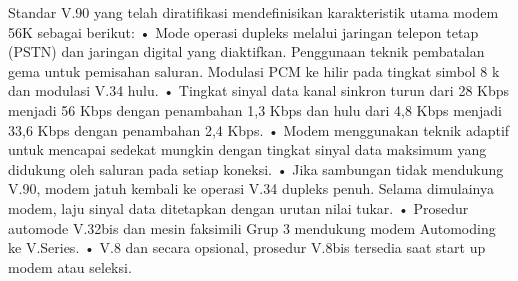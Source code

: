 \cite{gao1998introduction} Standar V.90 yang telah diratifikasi mendefinisikan karakteristik utama modem 56K sebagai berikut: • Mode operasi dupleks melalui jaringan telepon tetap (PSTN) dan jaringan digital yang diaktifkan. Penggunaan teknik pembatalan gema untuk pemisahan saluran. Modulasi PCM ke hilir pada tingkat simbol 8 k dan modulasi V.34 hulu. • Tingkat sinyal data kanal sinkron turun dari 28 Kbps menjadi 56 Kbps dengan penambahan 1,3 Kbps dan hulu dari 4,8 Kbps menjadi 33,6 Kbps dengan penambahan 2,4 Kbps. • Modem menggunakan teknik adaptif untuk mencapai sedekat mungkin dengan tingkat sinyal data maksimum yang didukung oleh saluran pada setiap koneksi. • Jika sambungan tidak mendukung V.90, modem jatuh kembali ke operasi V.34 dupleks penuh. Selama dimulainya modem, laju sinyal data ditetapkan dengan urutan nilai tukar. • Prosedur automode V.32bis dan mesin faksimili Grup 3 mendukung modem Automoding ke V.Series. • V.8 dan secara opsional, prosedur V.8bis tersedia saat start up modem atau seleksi.

